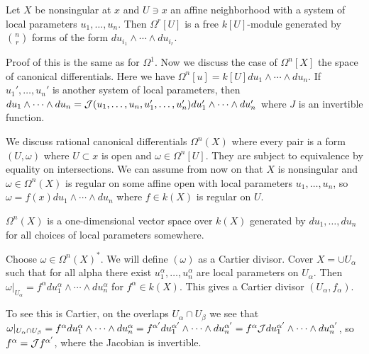 \documentclass[twoside, 10pt]{article}
\begin{document}
        \begin{thm}
            Let $X$ be nonsingular at $x$ and $U \ni x$ an affine neighborhood with a system of local parameters $u_1, \ldots, u_n$. Then $\Omega^r[U]$ is a free $k[U]$-module generated by $\binom{n}{r}$ forms of the form $du_{i_1} \land \cdots \land du_{i_r}$.
        \end{thm}

        Proof of this is the same as for $\Omega^1$. Now we discuss the case of $\Omega^n[X]$ the space of canonical differentials. Here we have $\Omega^n[u] = k[U] du_1 \land \cdots \land du_n$. If $u_1', \ldots, u_n'$ is another system of local parameters, then $du_1 \land \cdots \land du_n = \mathcal{J}(u_1, \ldots, u_n, u_1', \ldots, u_n') du_1' \land \cdots \land du_n'$ where $J$ is an invertible function.

        We discuss rational canonical differentials $\Omega^n(X)$ where every pair is a form $(U,\omega)$ where $U \subset x$ is open and $\omega \in \Omega^n[U]$. They are subject to equivalence by equality on intersections. We can assume from now on that $X$ is nonsingular and $\omega \in \Omega^n(X)$ is regular on some affine open with local parameters $u_1, \ldots, u_n$, so $\omega = f(x) du_1 \land \cdots \land du_n$ where $f \in k(X)$ is regular on $U$.

        \begin{lem}
            $\Omega^n(X)$ is a one-dimensional vector space over $k(X)$ generated by $du_1, \ldots, du_n$ for all choices of local parameters somewhere.
        \end{lem}

        \begin{defn}
            Choose $\omega \in \Omega^n(X)^*$. We will define $(\omega)$ as a Cartier divisor. Cover $X = \cup U_{\alpha}$ such that for all alpha there exist $u_1^{\alpha}, \ldots, u_n^{\alpha}$ are local parameters on $U_{\alpha}$. Then $\omega|_{U_{\alpha}} = f^{\alpha} du_1^{\alpha} \land \cdots \land du_n^{\alpha}$ for $f^{\alpha} \in k(X)$. This gives a Cartier divisor $(U_{\alpha}, f_{\alpha})$. 
            
            To see this is Cartier, on the overlaps $U_{\alpha} \cap U_{\beta}$ we see that $\omega|_{U_{\alpha} \cap U_{\beta}} = f^{\alpha} du_1^{\alpha} \land \cdots \land du_n^{\alpha} = f^{\alpha'} du_1^{\alpha'} \land \cdots \land du_n^{\alpha'} = f^{\alpha} \mathcal{J} du_1^{\alpha'} \land \cdots \land du_n^{\alpha'}$, so $f^{\alpha} = \mathcal{J} f^{\alpha'}$, where the Jacobian is invertible.
        \end{defn}
\end{document}
